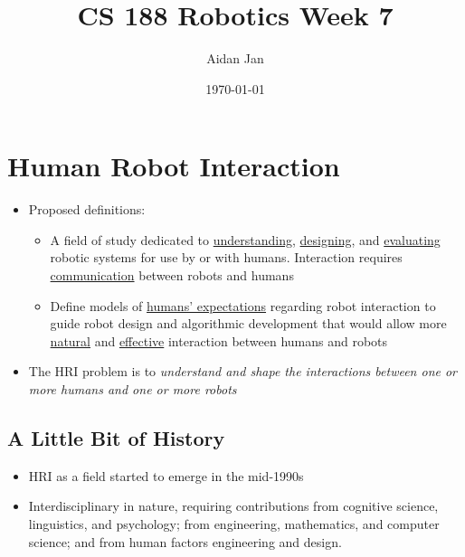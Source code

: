 \documentclass[10pt]{article}
\title{CS 188 Robotics Week 7}
\author{Aidan Jan}
\date{\today}
\begin{document}
\maketitle 

\section*{Human Robot Interaction}
\begin{itemize}
	\item Proposed definitions:
	\begin{itemize}
        \item A field of study dedicated to \underline{understanding}, \underline{designing}, and \underline{evaluating} robotic systems for use by or with humans.  Interaction requires \underline{communication} between robots and humans
        \item Define models of \underline{humans' expectations} regarding robot interaction to guide robot design and algorithmic development that would allow more \underline{natural} and \underline{effective} interaction between humans and robots
    \end{itemize}
	\item The HRI problem is to \textit{understand and shape the interactions between one or more humans and one or more robots}
\end{itemize}

\subsection*{A Little Bit of History}
\begin{itemize}
	\item HRI as a field started to emerge in the mid-1990s
	\item Interdisciplinary in nature, requiring contributions from cognitive science, linguistics, and psychology; from engineering, mathematics, and computer science; and from human factors engineering and design.
\end{itemize}
\end{document}
